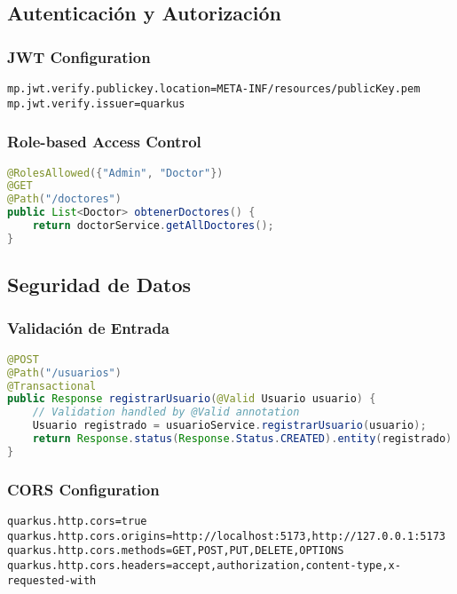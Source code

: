\documentclass[12pt,a4paper]{article}
\begin{document}
\subsection{Autenticación y Autorización}

\subsubsection{JWT Configuration}
\begin{lstlisting}[language=properties]
mp.jwt.verify.publickey.location=META-INF/resources/publicKey.pem
mp.jwt.verify.issuer=quarkus
\end{lstlisting}

\subsubsection{Role-based Access Control}
\begin{lstlisting}[language=java]
@RolesAllowed({"Admin", "Doctor"})
@GET
@Path("/doctores")
public List<Doctor> obtenerDoctores() {
    return doctorService.getAllDoctores();
}
\end{lstlisting}

\subsection{Seguridad de Datos}

\subsubsection{Validación de Entrada}
\begin{lstlisting}[language=java]
@POST
@Path("/usuarios")
@Transactional
public Response registrarUsuario(@Valid Usuario usuario) {
    // Validation handled by @Valid annotation
    Usuario registrado = usuarioService.registrarUsuario(usuario);
    return Response.status(Response.Status.CREATED).entity(registrado).build();
}
\end{lstlisting}

\subsubsection{CORS Configuration}
\begin{lstlisting}[language=properties]
quarkus.http.cors=true
quarkus.http.cors.origins=http://localhost:5173,http://127.0.0.1:5173
quarkus.http.cors.methods=GET,POST,PUT,DELETE,OPTIONS
quarkus.http.cors.headers=accept,authorization,content-type,x-requested-with
\end{lstlisting}
\end{document}
